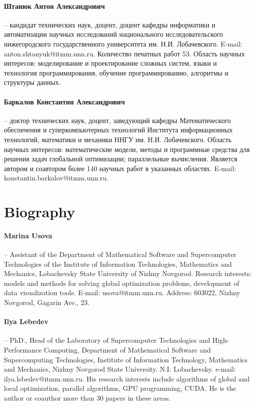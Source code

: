 \documentclass[a4paper,12pt,russian]{article}
\begin{document}
\paragraph{Штанюк Антон Александрович} -- кандидат технических наук, доцент, доцент кафедры информатики и автоматизации научных исследований национального исследовательского нижегородского государственного университета им. Н.И. Лобачевского. E-mail: anton.shtanyuk@itmm.unn.ru. Количество печатных работ 53. Область научных интересов: моделирование и проектирование сложных систем, языки и технология программирования, обучение программированию, алгоритмы и структуры данных.
\paragraph{Баркалов Константин Александрович} -- 
доктор технических наук, доцент, заведующий кафедры Математического обеспечения и суперкомпьютерных технологий Института информационных технологий, математики и механики ННГУ им. Н.И. Лобачевского. Область научных интересов: математические модели, методы и программные средства для решения задач глобальной оптимизации; параллельные вычисления. Является автором и соавтором более 140 научных работ в указанных областях. E-mail: konstantin.barkalov@itmm.unn.ru. 

\section*{Biography}

\paragraph{Marina Usova} -- Assistant of the Department of Mathematical Software and Supercomputer Technologies of the Institute of Information Technologies, Mathematics and Mechanics, Lobachevsky State University of Nizhny Novgorod. Research interests: models and methods for solving global optimization problems, development of data visualization tools. E-mail: usova@itmm.unn.ru. Address: 603022, Nizhny Novgorod, Gagarin Ave., 23.
\paragraph{Ilya Lebedev} -- PhD., Head of the Laboratory of Supercomputer Technologies and High-Performance Computing, Department of Mathematical Software and Supercomputing Technologies, Institute of Information Technology, Mathematics and Mechanics, Nizhny Novgorod State University. N.I. Lobachevsky. e-mail: ilya.lebedev@itmm.unn.ru. His research interests include algorithms of global and local optimization, parallel algorithms, GPU programming, CUDA. He is the author or coauthor more than 30 papers in these areas.
\end{document}

